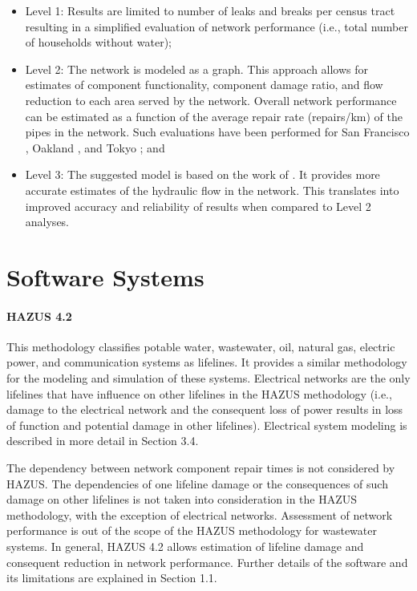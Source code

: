 \begin{itemize}
    \item Level 1: Results are limited to number of leaks and breaks per census tract resulting in a simplified evaluation of network performance (i.e., total number of households without water);
        \vspace{2mm}
    \item Level 2: The network is modeled as a graph. This approach allows for estimates of component functionality, component damage ratio, and flow reduction to each area served by the network. Overall network performance can be estimated as a function of the average repair rate (repairs/km) of the pipes in the network. Such evaluations have been performed for San Francisco \citep{markov1994evaluation}, Oakland \citep{geengineeringsystems1994nibs}, and Tokyo \citep{isoyama1982reliability}; and
        \vspace{2mm}
    \item Level 3: The suggested model is based on the work of \cite{khater1999potable}. It provides more accurate estimates of the hydraulic flow in the network. This translates into improved accuracy and reliability of results when compared to Level 2 analyses.
\end{itemize}

\section{Software Systems}
\label{sec:perf_pipeline_tools}

\paragraph{HAZUS 4.2} This methodology classifies potable water, wastewater, oil, natural gas, electric power, and communication systems as lifelines. It provides a similar methodology for the modeling and simulation of these systems. Electrical networks are the only lifelines that have influence on other lifelines in the HAZUS methodology (i.e., damage to the electrical network and the consequent loss of power results in loss of function and potential damage in other lifelines). Electrical system modeling is described in more detail in Section 3.4.

The dependency between network component repair times is not considered by HAZUS. The dependencies of one lifeline damage or the consequences of such damage on other lifelines is not taken into consideration in the HAZUS methodology, with the exception of electrical networks. Assessment of network performance is out of the scope of the HAZUS methodology for wastewater systems. In general, HAZUS 4.2 allows estimation of lifeline damage and consequent reduction in network performance. Further details of the software and its limitations are explained in Section 1.1.

